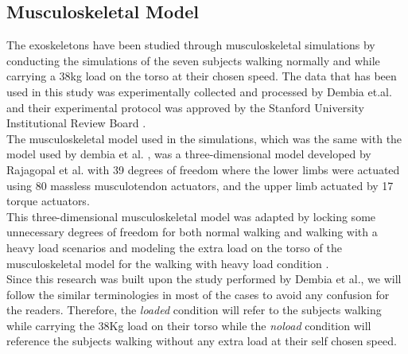 \documentclass[10pt,letterpaper]{article}
\begin{document}
\subsection*{Musculoskeletal Model}
The exoskeletons have been studied through musculoskeletal simulations by conducting the simulations of the seven subjects walking normally and while carrying a 38kg load on the torso at their chosen speed. The data that has been used in this study was experimentally collected and processed by Dembia et.al. \cite{93} and their experimental protocol was approved by the Stanford University Institutional Review Board \cite{93}.\\
The musculoskeletal model used in the simulations, which was the same with the model used by dembia et al. \cite{93}, was a three-dimensional model developed by Rajagopal et al. \cite{130} with 39 degrees of freedom where the lower limbs were actuated using 80 massless musculotendon actuators, and the upper limb actuated by 17 torque actuators\cite{130}. \\
This three-dimensional musculoskeletal model was adapted by locking some unnecessary degrees of freedom for both normal walking and walking with a heavy load scenarios and modeling the extra load on the torso of the musculoskeletal model for the walking with heavy load condition \cite{93}.\\
Since this research was built upon the study performed by Dembia et al., we will follow the similar terminologies in most of the cases to avoid any confusion for the readers. Therefore, the \textit{loaded} condition will refer to the subjects walking while carrying the 38Kg load on their torso while the \textit{noload} condition will reference the subjects walking without any extra load at their self chosen speed.
\end{document}
